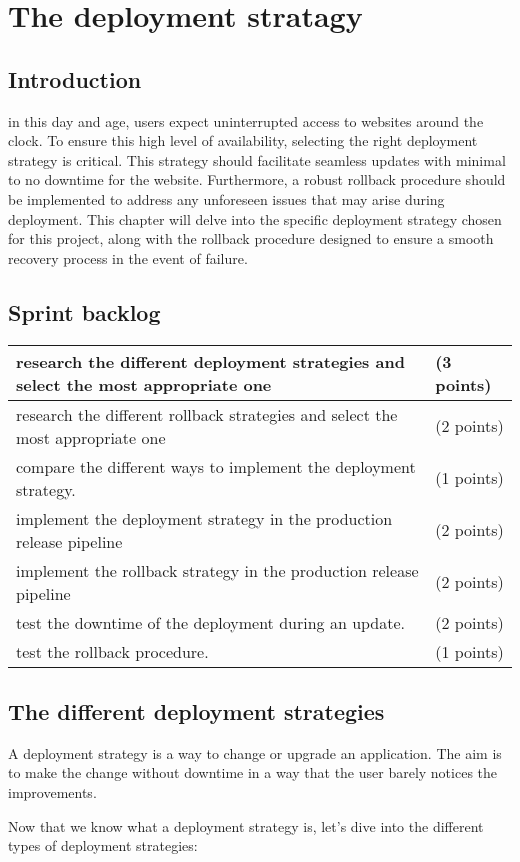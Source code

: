 \chapter{The deployment stratagy}
\section{Introduction}
in this day and age, users expect uninterrupted access to websites around the clock.  To ensure this high level of availability, selecting the right deployment strategy is critical.  This strategy should facilitate seamless updates with minimal to no downtime for the website.  Furthermore, a robust rollback procedure should be implemented to address any unforeseen issues that may arise during deployment.  This chapter will delve into the specific deployment strategy chosen for this project, along with the rollback procedure designed to ensure a smooth recovery process in the event of failure.
\section{Sprint backlog}
\begin{longtable}[c]{
    |p{}|
    p{}|
    }
    \hline
    research the different deployment strategies and select the most appropriate one & (3 points) \\
    \hline
    research the different rollback strategies and select the most appropriate one   & (2 points) \\
    \hline
    compare the different ways to implement the deployment strategy.                 & (1 points) \\
    \hline
    implement the deployment strategy in the production release pipeline             & (2 points) \\
    \hline
    implement the rollback strategy in the production release pipeline               & (2 points) \\
    \hline
    test the downtime of the deployment during an update.                            & (2 points) \\
    \hline
    test the rollback procedure.                                                     & (1 points) \\
    \hline
\end{longtable}
\section{The different deployment strategies \cite{webArticle6}}
A deployment strategy is a way to change or upgrade an application. The aim is to make the change without downtime in a way that the user barely notices the improvements.
\par Now that we know what a deployment strategy is, let's dive into the different types of deployment strategies:

